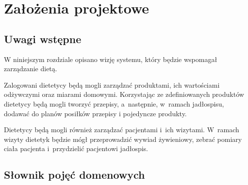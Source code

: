 \chapter{Założenia projektowe}\label{ch:design-assumptions}
\section{Uwagi wstępne}\label{sec:presumptions}
W niniejszym rozdziale opisano wizję systemu, który będzie wspomagał zarządzanie dietą.
\par
Zalogowani dietetycy będą mogli zarządzać produktami, ich wartościami odżywczymi oraz
miarami domowymi. Korzystając ze zdefiniowanych produktów dietetycy będą mogli tworzyć
przepisy, a~następnie, w~ramach jadłospisu, dodawać do planów posiłków przepisy
i pojedyncze produkty.
\par
Dietetycy będą mogli również zarządzać pacjentami i~ich wizytami. W~ramach wizyty dietetyk
będzie mógł przeprowadzić wywiad żywieniowy, zebrać pomiary ciała pacjenta i~przydzielić
pacjentowi jadłospis.


\section{Słownik pojęć domenowych}\label{sec:dictionary}

